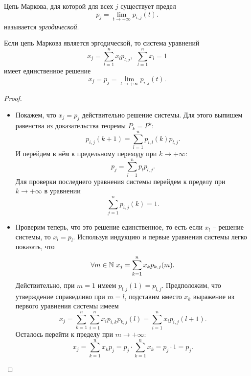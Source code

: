 \begin{definition}
    Цепь Маркова, для которой для всех $j$ существует предел
    \[
        p_j = \lim_{t \to +\infty}{p_{i, j}(t)}
    .\]
    называется \textit{эргодической}.
\end{definition}

\begin{theorem}
    Если цепь Маркова является эргодической, то система уравнений
    \[
        x_j = \sum_{l = 1}^n{x_l p_{l, j}},~~ \sum_{l = 1}^n{x_l} = 1
    \]
    имеет единственное решение
    \[
        x_j = p_j = \lim_{t \to +\infty}{p_{i, j}(t)}
    .\]
\end{theorem}
\begin{proof}
    \enewline
    \begin{itemize}
        \item Покажем, что $x_j = p_j$ действительно решение системы. Для 
            этого выпишем равенства из доказательства теоремы $P_k = P^k$:
            \[
                p_{i, j}(k + 1) = \sum_{l = 1}^n{p_{i, l}(k) p_{l, j}}
            .\]
            И перейдем в нём к предельному переходу при $k \to +\infty$:
            \[
                p_j = \sum_{l = 1}^n{p_l p_{l, j}}  
            .\]
            Для проверки последнего уравнения системы перейдем к пределу
            при $k \to +\infty$ в уравнении
            \[
                \sum_{j = 1}^n{p_{i, j}(k)} = 1
            .\]
        \item Проверим теперь, что это решение единственное, то есть если
            $x_l$ -- решение системы, то $x_l = p_l$. Используя индукцию
            и первые уравнения системы легко показать, что
            \[
                \forall m \in \mathbb{N}~ x_j = \sum_{k = 1}^n{x_k p_{k, j}(m)}
            .\]
            Действительно, при $m = 1$ имеем $p_{l, j}(1) = p_{l, j}$. 
            Предположим, что утверждение справедливо при $m = l$, подставим
            вместо $x_k$ выражение из первого уравнения системы имеем
            \[
                x_j = \sum_{k = 1}^n{\sum_{i = 1}^n{x_i p_{i, k} p_{k, j}(l)}} =
                \sum_{i = 1}^n{x_i p_{i, j}(l + 1)}
            .\]
            Осталось перейти к пределу при $m \to +\infty$:
            \[
                x_j = \sum_{k = 1}^n{x_k p_j} = p_j \cdot \sum_{k = 1}^n{x_k} 
                = p_j \cdot 1 = p_j
            .\] 
    \end{itemize}
\end{proof}

